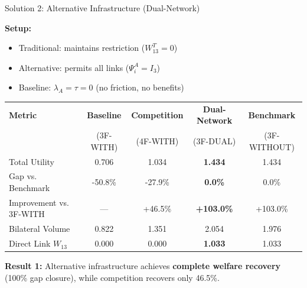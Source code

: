 \documentclass[aspectratio=169]{beamer}
\begin{document}
\begin{frame}{Solution 2: Alternative Infrastructure (Dual-Network)}
    
    \textbf{Setup:}
    \begin{itemize}
        \item Traditional: maintains restriction ($W_{13}^T = 0$)
        \item Alternative: permits all links ($\Psi_i^A = I_3$)
        \item Baseline: $\lambda_A = \tau = 0$ (no friction, no benefits)
    \end{itemize}
    
    \vspace{0.3cm}
    \begin{table}
        \centering
        \small
        \begin{tabular}{lcccc}
            \toprule
            \textbf{Metric} & \textbf{Baseline} & \textbf{Competition} & \textbf{Dual-Network} & \textbf{Benchmark} \\
             & (3F-WITH) & (4F-WITH) & (3F-DUAL) & (3F-WITHOUT) \\
            \midrule
            Total Utility & 0.706 & 1.034 & \textcolor{SafeGreen}{\textbf{1.434}} & 1.434 \\
            Gap vs. Benchmark & -50.8\% & -27.9\% & \textcolor{SafeGreen}{\textbf{0.0\%}} & 0.0\% \\
            Improvement vs. 3F-WITH & --- & +46.5\% & \textcolor{SafeGreen}{\textbf{+103.0\%}} & +103.0\% \\
            \midrule
            Bilateral Volume & 0.822 & 1.351 & 2.054 & 1.976 \\
            Direct Link $W_{13}$ & 0.000 & 0.000 & \textbf{1.033} & 1.033 \\
            \bottomrule
        \end{tabular}
    \end{table}
    
    \vspace{0.2cm}
    \textbf{Result 1:} Alternative infrastructure achieves \textcolor{SafeGreen}{\textbf{complete welfare recovery}} (100\% gap closure), while competition recovers only 46.5\%.

\end{frame}
\end{document}
